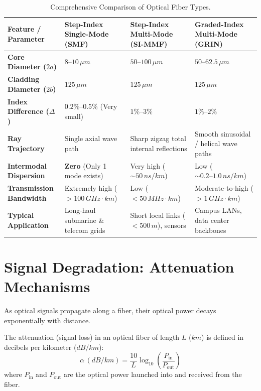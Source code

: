 \begin{table}[htbp]
\centering
\small
\renewcommand{\arraystretch}{1.3}
\begin{tabularx}{\linewidth}{lXXX}
\toprule
\textbf{Feature / Parameter} & \textbf{Step-Index Single-Mode (SMF)} & \textbf{Step-Index Multi-Mode (SI-MMF)} & \textbf{Graded-Index Multi-Mode (GRIN)} \\
\midrule
\textbf{Core Diameter ($2a$)} & $8\text{--}10\,\si{\mu m}$ & $50\text{--}100\,\si{\mu m}$ & $50\text{--}62.5\,\si{\mu m}$ \\
\textbf{Cladding Diameter ($2b$)} & $125\,\si{\mu m}$ & $125\,\si{\mu m}$ & $125\,\si{\mu m}$ \\
\textbf{Index Difference ($\Delta$)} & $0.2\%\text{--}0.5\%$ (Very small) & $1\%\text{--}3\%$ & $1\%\text{--}2\%$ \\
\textbf{Ray Trajectory} & Single axial wave path & Sharp zigzag total internal reflections & Smooth sinusoidal / helical wave paths \\
\textbf{Intermodal Dispersion} & \textbf{Zero} (Only 1 mode exists) & Very high ($\sim 50\,\si{ns/km}$) & Low ($\sim 0.2\text{--}1.0\,\si{ns/km}$) \\
\textbf{Transmission Bandwidth} & Extremely high ($>100\,\si{GHz\cdot km}$) & Low ($<50\,\si{MHz\cdot km}$) & Moderate-to-high ($>1\,\si{GHz\cdot km}$) \\
\textbf{Typical Application} & Long-haul submarine \& telecom grids & Short local links ($<500\,\si{m}$), sensors & Campus LANs, data center backbones \\
\bottomrule
\end{tabularx}
\caption{Comprehensive Comparison of Optical Fiber Types.}
\label{tab:fiber-comparison-master}
\end{table}

\section{Signal Degradation: Attenuation Mechanisms}

As optical signals propagate along a fiber, their optical power decays exponentially with distance.

\begin{definition}
The attenuation (signal loss) in an optical fiber of length $L$ ($\si{km}$) is defined in decibels per kilometer ($\si{dB/km}$):
\begin{equation}
    \alpha\,(\si{dB/km}) = \frac{10}{L} \log_{10}\left( \frac{P_{\text{in}}}{P_{\text{out}}} \right)
\end{equation}
where $P_{\text{in}}$ and $P_{\text{out}}$ are the optical power launched into and received from the fiber.
\end{definition}

